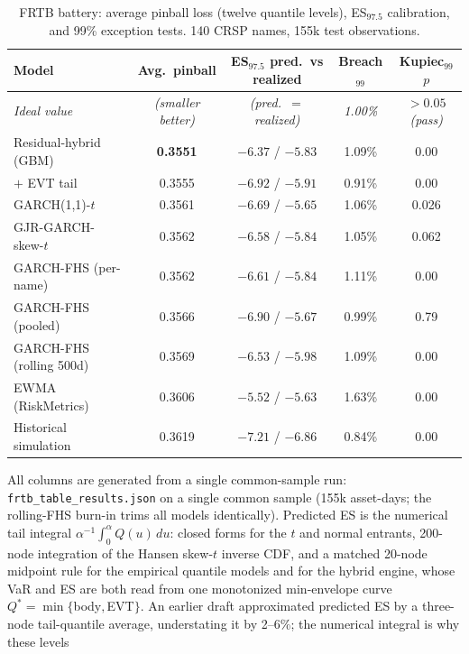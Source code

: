 \documentclass[11pt]{article}
\theoremstyle{remark}
\begin{document}
\begin{table}[t]
\centering
\begin{threeparttable}
\caption{FRTB battery: average pinball loss (twelve quantile levels),
ES$_{97.5}$ calibration, and 99\% exception tests. 140 CRSP names, 155k
test observations.}
\label{tab:frtb}
\small\setlength{\tabcolsep}{4.5pt}
\begin{tabular}{lcccc}
\toprule
Model & Avg.\ pinball & ES$_{97.5}$ pred.\ vs realized & Breach$_{99}$ & Kupiec$_{99}$ $p$ \\
\midrule
\emph{Ideal value} & \emph{(smaller better)} & \emph{(pred.\ $=$ realized)} & \emph{1.00\%} & \emph{$>0.05$ (pass)} \\
\midrule
Residual-hybrid (GBM) & \textbf{0.3551} & $-6.37$ / $-5.83$ & 1.09\% & 0.00 \\
\quad $+$ EVT tail & 0.3555 & $-6.92$ / $-5.91$ & 0.91\% & 0.00 \\
GARCH(1,1)-$t$ & 0.3561 & $-6.69$ / $-5.65$ & 1.06\% & 0.026 \\
GJR-GARCH-skew-$t$ & 0.3562 & $-6.58$ / $-5.84$ & 1.05\% & 0.062 \\
GARCH-FHS (per-name) & 0.3562 & $-6.61$ / $-5.84$ & 1.11\% & 0.00 \\
GARCH-FHS (pooled) & 0.3566 & $-6.90$ / $-5.67$ & 0.99\% & 0.79 \\
GARCH-FHS (rolling 500d) & 0.3569 & $-6.53$ / $-5.98$ & 1.09\% & 0.00 \\
EWMA (RiskMetrics) & 0.3606 & $-5.52$ / $-5.63$ & 1.63\% & 0.00 \\
Historical simulation & 0.3619 & $-7.21$ / $-6.86$ & 0.84\% & 0.00 \\
\bottomrule
\end{tabular}
\begin{tablenotes}\footnotesize
\item All columns are generated from a single common-sample run:
\texttt{frtb\_table\_results.json} on a single common sample (155k
asset-days; the rolling-FHS burn-in trims all models identically).
Predicted ES is the numerical tail integral
$\alpha^{-1}\!\int_0^\alpha Q(u)\,du$: closed forms for the $t$ and
normal entrants, 200-node integration of the Hansen skew-$t$ inverse
CDF, and a matched 20-node midpoint rule for the empirical quantile
models and for the hybrid engine, whose VaR and ES are both read from
one monotonized min-envelope curve $Q^{*}=\min\{$body$,$EVT$\}$. An earlier draft
approximated predicted ES by a three-node tail-quantile average,
understating it by 2--6\%; the numerical integral is why these levels

\end{tablenotes}
\end{threeparttable}
\end{table}
\end{document}
